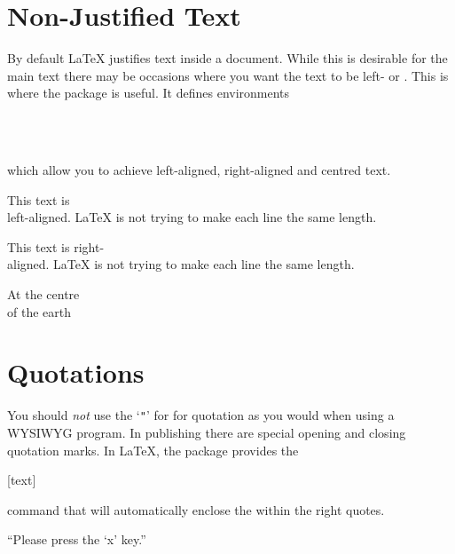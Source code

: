 \section{Non-Justified Text}\label{sec:ragged}

By default \LaTeX{} justifies text inside a document. While this is desirable
for the main text there may be occasions where you want the text to be left- or
. This is where the 
package is useful. It defines environments
\begin{lscommand}
   \\
   \\
\end{lscommand}
which allow you to achieve left-aligned, right-aligned and centred text.

\begin{example}
\begin{FlushLeft}
  This text is\\ left-aligned.
  \LaTeX{} is not trying to make
  each line the same length.
\end{FlushLeft}
\end{example}

\begin{example}
\begin{FlushRight}
  This text is right-\\aligned.
  \LaTeX{} is not trying to make
  each line the same length.
\end{FlushRight}
\end{example}

\begin{example}
\begin{Center}
  At the centre\\of the earth
\end{Center}
\end{example}

\section{Quotations}\label{sec:csquotes}

You should \emph{not} use the \enquote*{\texttt{"}} for %
 for quotation as you would when
using a WYSIWYG program.  In publishing there are special opening and closing
quotation marks. In \LaTeX{}, the  package provides the
\begin{lscommand}
  [text]
\end{lscommand}
command that will automatically enclose the  within the right
quotes.
\begin{example}
\enquote{Please press
  the \enquote{x} key.}
\end{example}

